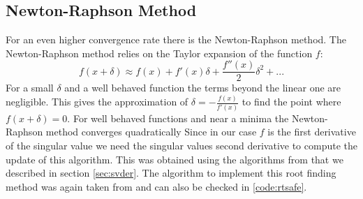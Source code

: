 \documentclass[a4paper, oneside]{discothesis}
\begin{document}
\subsection{Newton-Raphson Method}
For an even higher convergence rate there is the Newton-Raphson method.
The Newton-Raphson method relies on the Taylor expansion of the function $f$:
\begin{equation}
	f(x+\delta) \approx f(x) + f'(x)\delta + \frac{f''(x)}{2}\delta^2 + ...
\end{equation}
For a small $\delta$ and a well behaved function the terms beyond the linear one are negligible.
This gives the approximation of $\delta = -\frac{f(x)}{f'(x)}$ to find the point where $f(x+\delta)=0$.
For well behaved functions and near a minima the Newton-Raphson method converges quadratically \cite{traub2014analytic}
Since in our case $f$ is the first derivative of the singular value we need the singular values second derivative to compute the update of this algorithm.
This was obtained using the algorithms from \cite{doi:10.1002/nme.1620260202} that we described in section \ref{sec:svder}.
The algorithm to implement this root finding method was again taken from \cite{rf} and can also be checked in \ref{code:rtsafe}.
\end{document}
